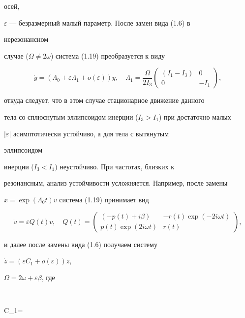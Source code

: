 осей, 


$\varepsilon$ --- безразмерный малый параметр. После замен вида (1.6) в 


нерезонансном 


случае ($\Omega\ne2\omega$) система (1.19) преобразуется к виду 


$$ 


\Dot y=(\Lambda_0+\varepsilon\Lambda_1+o(\varepsilon))y,\quad 


\Lambda_1=\frac{\Omega}{2I_3} 


\begin{pmatrix} 


(I_1-I_3) & 0 \\ 0 & -I_1 


\end{pmatrix} 


, 


$$ 


откуда следует, что в этом случае стационарное движение данного  


тела со сплюснутым эллипсоидом инерции ($I_3>I_1$) при достаточно малых 


$|\varepsilon|$ асимптотически устойчиво, а для тела с вытянутым 


эллипсоидом 


инерции ($I_3<I_1$) неустойчиво. При частотах, близких к 


резонансным, анализ устойчивости усложняется. Например, после замены 


$x=\exp(\Lambda_0t)v$ система (1.19) принимает вид 


$$ 


\Dot v=\varepsilon Q(t)v,\quad Q(t)= 


\begin{pmatrix} 


(-p(t)+i\beta) & -r(t)\exp(-2i\omega t) \\ 


p(t)\exp(2i\omega t) & r(t) 


\end{pmatrix} 


,


$$ 


и далее после замены вида (1.6) получаем систему 


$\Dot z=(\varepsilon C_1+o(\varepsilon))z$,\;


$\Omega=2\omega+\varepsilon\beta$, где 


$$ 


C_1= 


